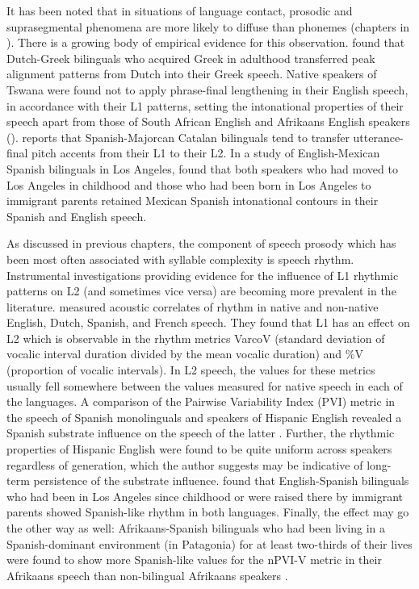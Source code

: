   It has been noted that in situations of language contact, prosodic and suprasegmental phenomena are more likely to diffuse than phonemes (chapters in \citealt{AikhenvaldDixon2001b}). There is a growing body of empirical evidence for this observation. \citet{Mennen2004} found that Dutch-Greek bilinguals who acquired Greek in adulthood transferred peak alignment patterns from Dutch into their Greek speech. Native speakers of Tswana were found not to apply phrase-final lengthening in their English speech, in accordance with their L1 patterns, setting the intonational properties of their speech apart from those of South African English and Afrikaans English speakers (\citealt{CoetzeeWissing2007}). \citet{Simonet2011} reports that Spanish-Majorcan Catalan bilinguals tend to transfer utterance-final pitch accents from their L1 to their L2. In a study of English-Mexican Spanish bilinguals in Los Angeles, \citet{Robles-Puente2014} found that both speakers who had moved to Los Angeles in childhood and those who had been born in Los Angeles to immigrant parents retained Mexican Spanish intonational contours in their Spanish and English speech.

  As discussed in previous chapters, the component of speech prosody which has been most often associated with syllable complexity is speech rhythm. Instrumental investigations providing evidence for the influence of L1 rhythmic patterns on L2 (and sometimes vice versa) are becoming more prevalent in the literature. \citet{WhiteMattys2007} measured acoustic correlates of rhythm in native and non-native English, Dutch, Spanish, and French speech. They found that L1 has an effect on L2 which is observable in the rhythm metrics VarcoV (standard deviation of vocalic interval duration divided by the mean vocalic duration) and \%V (proportion of vocalic intervals). In L2 speech, the values for these metrics usually fell somewhere between the values measured for native speech in each of the languages. A comparison of the Pairwise Variability Index (PVI) metric in the speech of Spanish monolinguals and speakers of Hispanic English revealed a Spanish substrate influence on the speech of the latter \citep{Carter2005}. Further, the rhythmic properties of Hispanic English were found to be quite uniform across speakers regardless of generation, which the author suggests may be indicative of long-term persistence of  the substrate influence. \citet{Robles-Puente2014} found that English-Spanish bilinguals who had been in Los Angeles since childhood or were raised there by immigrant parents showed Spanish-like rhythm in both languages. Finally, the effect may go the other way as well: Afrikaans-Spanish bilinguals who had been living in a Spanish-dominant environment (in Patagonia) for at least two-thirds of their lives were found to show more Spanish-like values for the nPVI-V metric in their Afrikaans speech than non-bilingual Afrikaans speakers \citep{CoetzeeEtAl2015}. 

